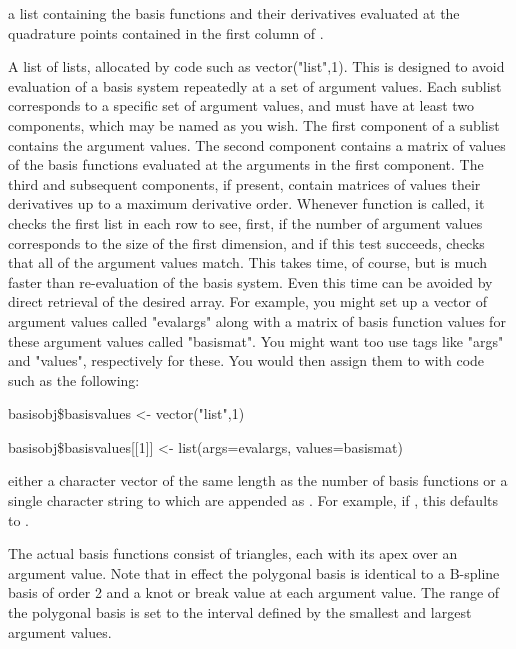 \begin{Arguments}
\begin{ldescription}
\item[\code{values}] a list containing the basis functions and their derivatives
evaluated at the quadrature points contained in the first
column of .

\item[\code{basisvalues}] A list of lists, allocated by code such as vector("list",1).  This
is designed to avoid evaluation of a basis system repeatedly
at a set of argument values.  Each sublist corresponds to a specific
set of argument values, and must have at least two components, which
may be named as you wish.  The first component of a sublist contains
the argument values.  The second component contains a matrix of
values of the basis functions evaluated at the arguments in the
first component.  The third and subsequent components, if present,
contain matrices of values their derivatives up to a maximum
derivative order.  Whenever function  is
called, it checks the first list in each row to see, first, if the
number of argument values corresponds to the size of the first
dimension, and if this test succeeds, checks that all of the
argument values match.  This takes time, of course, but is much
faster than re-evaluation of the basis system.  Even this time can
be avoided by direct retrieval of the desired array. For example,
you might set up a vector of argument values called "evalargs" along
with a matrix of basis function values for these argument values
called "basismat".  You might want too use tags like "args" and
"values", respectively for these.  You would then assign them to
 with code such as the following:

basisobj\$basisvalues <- vector("list",1)

basisobj\$basisvalues[[1]] <- list(args=evalargs, values=basismat)

\item[\code{names}] either a character vector of the same length as the number of basis
functions or a single character string to which  are
appended as .  For example, if
, this defaults to .

\end{ldescription}
\end{Arguments}
\begin{Details}\relax
The actual basis functions consist of triangles, each with its apex
over an argument value. Note that in effect the polygonal basis is
identical to a B-spline basis of order 2 and a knot or break value at
each argument value.  The range of the polygonal basis is set to the
interval defined by the smallest and largest argument values.
\end{Details}
